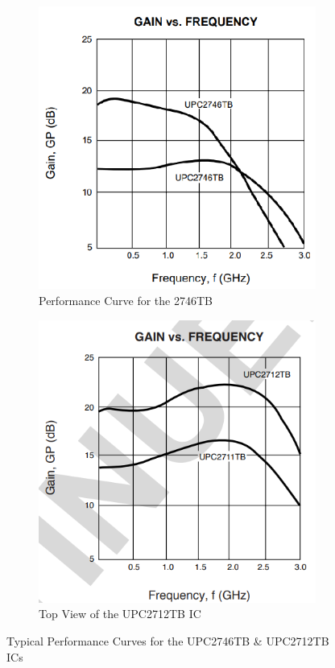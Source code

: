 \begin{figure}[H]
	\setlength{\unitlength}{\textwidth} 
	\centering
	\begin{subfigure}{.5\textwidth}
  		\centering
  		\includegraphics[width=0.3\unitlength]{2746_perf}
  		\caption{\label{fig:2746perf}Performance Curve for the 2746TB }
	\end{subfigure}%
	\begin{subfigure}{.5\textwidth}
  		\centering
		\includegraphics[width=0.3\unitlength]{2712_perf}
  		\caption{\label{fig:2712perf}Top View of the UPC2712TB IC}
	\end{subfigure}
\caption{\label{fig:274612perf} Typical Performance Curves for the UPC2746TB \& UPC2712TB ICs   }
\end{figure}	


